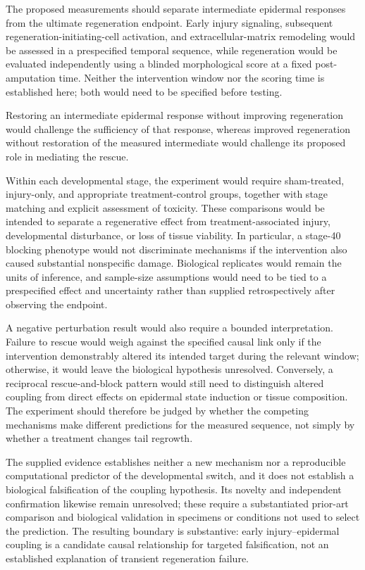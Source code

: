 \documentclass[11pt]{article}
\begin{document}
The proposed measurements should separate intermediate epidermal responses from the ultimate regeneration endpoint. Early injury signaling, subsequent regeneration-initiating-cell activation, and extracellular-matrix remodeling would be assessed in a prespecified temporal sequence, while regeneration would be evaluated independently using a blinded morphological score at a fixed post-amputation time. Neither the intervention window nor the scoring time is established here; both would need to be specified before testing.

Restoring an intermediate epidermal response without improving regeneration would challenge the sufficiency of that response, whereas improved regeneration without restoration of the measured intermediate would challenge its proposed role in mediating the rescue.

Within each developmental stage, the experiment would require sham-treated, injury-only, and appropriate treatment-control groups, together with stage matching and explicit assessment of toxicity. These comparisons would be intended to separate a regenerative effect from treatment-associated injury, developmental disturbance, or loss of tissue viability. In particular, a stage-40 blocking phenotype would not discriminate mechanisms if the intervention also caused substantial nonspecific damage. Biological replicates would remain the units of inference, and sample-size assumptions would need to be tied to a prespecified effect and uncertainty rather than supplied retrospectively after observing the endpoint.

A negative perturbation result would also require a bounded interpretation. Failure to rescue would weigh against the specified causal link only if the intervention demonstrably altered its intended target during the relevant window; otherwise, it would leave the biological hypothesis unresolved. Conversely, a reciprocal rescue-and-block pattern would still need to distinguish altered coupling from direct effects on epidermal state induction or tissue composition. The experiment should therefore be judged by whether the competing mechanisms make different predictions for the measured sequence, not simply by whether a treatment changes tail regrowth.

The supplied evidence establishes neither a new mechanism nor a reproducible computational predictor of the developmental switch, and it does not establish a biological falsification of the coupling hypothesis. Its novelty and independent confirmation likewise remain unresolved; these require a substantiated prior-art comparison and biological validation in specimens or conditions not used to select the prediction. The resulting boundary is substantive: early injury–epidermal coupling is a candidate causal relationship for targeted falsification, not an established explanation of transient regeneration failure.
\end{document}
